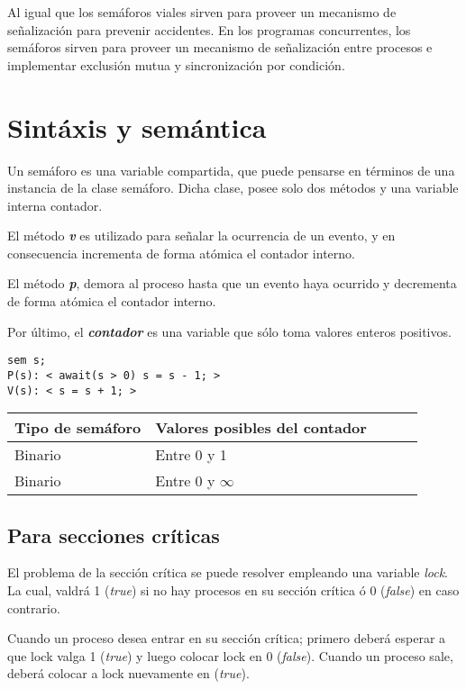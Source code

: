 \documentclass[a4paper, 11pt]{book}
\begin{document}
Al igual que los semáforos viales sirven para proveer un mecanismo de señalización para prevenir accidentes. En los programas concurrentes, los semáforos sirven para proveer un mecanismo de señalización entre procesos e implementar exclusión mutua y sincronización por condición.

\section{Sintáxis y semántica}

Un semáforo es una variable compartida, que puede pensarse en términos de una instancia de la clase semáforo. Dicha clase, posee solo dos métodos y una variable interna contador. 

El método \textbf{\emph{v}} es utilizado para señalar la ocurrencia de un evento, y en consecuencia incrementa de forma atómica el contador interno.

El método \textbf{\emph{p}}, demora al proceso hasta que un evento haya ocurrido y decrementa de forma atómica el contador interno.

Por último, el \textbf{\emph{contador}} es una variable que sólo toma valores enteros positivos.

\begin{lstlisting}
sem s;
P(s): < await(s > 0) s = s - 1; >
V(s): < s = s + 1; >
\end{lstlisting}

\begin{table}
\begin{tabular}{lllll} 
\hline
Tipo de semáforo & Valores posibles del contador \\ 
\hline
Binario & Entre 0 y 1 \\ 
\hline
Binario & Entre 0 y $\infty$ \\ 
\hline
\end{tabular}
\end{table}

\subsection{Para secciones críticas}

El problema de la sección crítica se puede resolver empleando una variable \emph{lock}. La cual, valdrá 1 (\emph{true}) si no hay procesos en su sección crítica ó 0 (\emph{false}) en caso contrario.

Cuando un proceso desea entrar en su sección crítica; primero deberá esperar a que lock valga 1 (\emph{true}) y luego colocar lock en 0 (\emph{false}). Cuando un proceso sale, deberá colocar a lock nuevamente en (\emph{true}).
\end{document}
